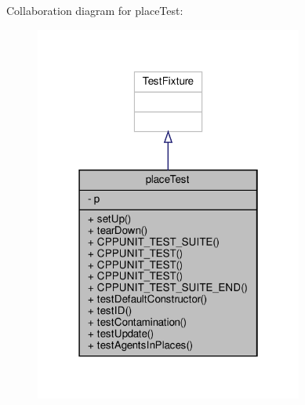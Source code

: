 Collaboration diagram for place\+Test\+:\nopagebreak
\begin{figure}[H]
\begin{center}
\leavevmode
\includegraphics[width=250pt]{classplaceTest__coll__graph}
\end{center}
\end{figure}
